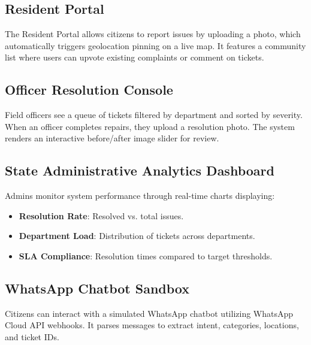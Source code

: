 \documentclass[journal]{IEEEtran}
\begin{document}
\subsection{Resident Portal}
The Resident Portal allows citizens to report issues by uploading a photo, which automatically triggers geolocation pinning on a live map. It features a community list where users can upvote existing complaints or comment on tickets.

\subsection{Officer Resolution Console}
Field officers see a queue of tickets filtered by department and sorted by severity. When an officer completes repairs, they upload a resolution photo. The system renders an interactive before/after image slider for review.

\subsection{State Administrative Analytics Dashboard}
Admins monitor system performance through real-time charts displaying:
\begin{itemize}
    \item \textbf{Resolution Rate}: Resolved vs. total issues.
    \item \textbf{Department Load}: Distribution of tickets across departments.
    \item \textbf{SLA Compliance}: Resolution times compared to target thresholds.
\end{itemize}

\subsection{WhatsApp Chatbot Sandbox}
Citizens can interact with a simulated WhatsApp chatbot utilizing WhatsApp Cloud API webhooks. It parses messages to extract intent, categories, locations, and ticket IDs.
\end{document}
